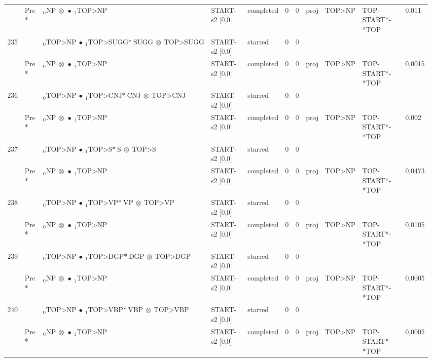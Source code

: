 \documentclass[10pt]{article}
\begin{document}
\begin{longtable}[htbp]{lllllllllll}
 & Pre *& $ {}_0 \textrm{NP} \  \otimes \  \bullet \ {}_{1} \textrm{TOP>NP} $ & START-s2 [0,0] & completed & 0 & 0 & proj & TOP>NP & TOP-START*-*TOP & 0,011 \\ 
235 & & $ {}_0 \textrm{TOP>NP} \  \bullet \ {}_{1} \textrm{TOP>SUGG*} \ \textrm{SUGG} \  \otimes \ \textrm{TOP>SUGG} $ & START-s2 [0,0] & starred & 0 & 0 & & & & \\ 
 & Pre *& $ {}_0 \textrm{NP} \  \otimes \  \bullet \ {}_{1} \textrm{TOP>NP} $ & START-s2 [0,0] & completed & 0 & 0 & proj & TOP>NP & TOP-START*-*TOP & 0,0015 \\ 
236 & & $ {}_0 \textrm{TOP>NP} \  \bullet \ {}_{1} \textrm{TOP>CNJ*} \ \textrm{CNJ} \  \otimes \ \textrm{TOP>CNJ} $ & START-s2 [0,0] & starred & 0 & 0 & & & & \\ 
 & Pre *& $ {}_0 \textrm{NP} \  \otimes \  \bullet \ {}_{1} \textrm{TOP>NP} $ & START-s2 [0,0] & completed & 0 & 0 & proj & TOP>NP & TOP-START*-*TOP & 0,002 \\ 
237 & & $ {}_0 \textrm{TOP>NP} \  \bullet \ {}_{1} \textrm{TOP>S*} \ \textrm{S} \  \otimes \ \textrm{TOP>S} $ & START-s2 [0,0] & starred & 0 & 0 & & & & \\ 
 & Pre *& $ {}_0 \textrm{NP} \  \otimes \  \bullet \ {}_{1} \textrm{TOP>NP} $ & START-s2 [0,0] & completed & 0 & 0 & proj & TOP>NP & TOP-START*-*TOP & 0,0473 \\ 
238 & & $ {}_0 \textrm{TOP>NP} \  \bullet \ {}_{1} \textrm{TOP>VP*} \ \textrm{VP} \  \otimes \ \textrm{TOP>VP} $ & START-s2 [0,0] & starred & 0 & 0 & & & & \\ 
 & Pre *& $ {}_0 \textrm{NP} \  \otimes \  \bullet \ {}_{1} \textrm{TOP>NP} $ & START-s2 [0,0] & completed & 0 & 0 & proj & TOP>NP & TOP-START*-*TOP & 0,0105 \\ 
239 & & $ {}_0 \textrm{TOP>NP} \  \bullet \ {}_{1} \textrm{TOP>DGP*} \ \textrm{DGP} \  \otimes \ \textrm{TOP>DGP} $ & START-s2 [0,0] & starred & 0 & 0 & & & & \\ 
 & Pre *& $ {}_0 \textrm{NP} \  \otimes \  \bullet \ {}_{1} \textrm{TOP>NP} $ & START-s2 [0,0] & completed & 0 & 0 & proj & TOP>NP & TOP-START*-*TOP & 0,0005 \\ 
240 & & $ {}_0 \textrm{TOP>NP} \  \bullet \ {}_{1} \textrm{TOP>VBP*} \ \textrm{VBP} \  \otimes \ \textrm{TOP>VBP} $ & START-s2 [0,0] & starred & 0 & 0 & & & & \\ 
 & Pre *& $ {}_0 \textrm{NP} \  \otimes \  \bullet \ {}_{1} \textrm{TOP>NP} $ & START-s2 [0,0] & completed & 0 & 0 & proj & TOP>NP & TOP-START*-*TOP & 0,0005 \\ 

\end{longtable}
\end{document}
